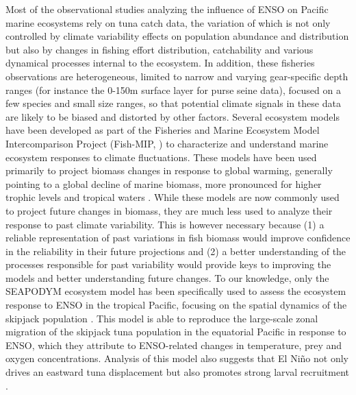Most of the observational studies analyzing the influence of ENSO on Pacific marine ecosystems rely on tuna catch data, the variation of which is not only controlled by climate variability effects on population abundance and distribution but also by changes in fishing effort distribution, catchability and various dynamical processes internal to the ecosystem. In addition, these fisheries observations are heterogeneous, limited to narrow and varying gear-specific depth ranges (for instance the 0-150m surface layer for purse seine data), focused on a few species and small size ranges, so that potential climate signals in these data are likely to be biased and distorted by other factors. Several ecosystem models have been developed as part of the Fisheries and Marine Ecosystem Model Intercomparison Project (Fish-MIP, \citealp{tittensorProtocolIntercomparisonMarine2018}) to characterize and understand marine ecosystem responses to climate fluctuations. These models have been used primarily to project biomass changes in response to global warming, generally pointing to a global decline of marine biomass, more pronounced for higher trophic levels and tropical waters \citep{lotzeGlobalEnsembleProjections2019, tittensorNextgenerationEnsembleProjections2021}. While these models are now commonly used to project future  changes in biomass, they are much less used to analyze their response to past climate variability. This is however necessary because (1) a reliable representation of past variations in fish biomass would improve confidence in the reliability in their future projections and (2) a better understanding of the processes responsible for past variability would provide keys to improving the models and better understanding future changes. To our knowledge, only the SEAPODYM \citep{lehodeySpatialEcosystemPopulations2008} ecosystem model has been specifically used to assess the ecosystem response to ENSO in the tropical Pacific, focusing on the spatial dynamics of the skipjack population \citep{lehodeyPelagicEcosystemTropical2001}. This model is able to reproduce the large-scale zonal migration of the skipjack tuna population in the equatorial Pacific in response to ENSO, which they attribute to ENSO-related changes in temperature, prey and oxygen concentrations. Analysis of this model also suggests that El Niño not only drives an eastward tuna displacement but also promotes  strong larval recruitment \citep{seninaParameterEstimationBasinscale2008}. 
